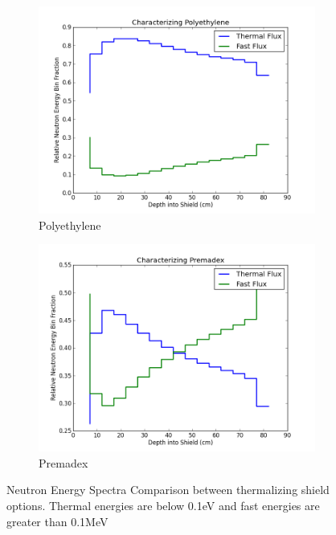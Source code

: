 \documentclass{mc2015}
\begin{document}
\begin{figure}
	\centering
	\begin{subfigure}{0.49\textwidth}
		\includegraphics[width=\textwidth]{Poly_char.png}
		\caption{Polyethylene}
		\label{fig:polychar}
	\end{subfigure}
	\begin{subfigure}{0.49\textwidth}
		\includegraphics[width=\textwidth]{Prem_char.png}
		\caption{Premadex}
		\label{fig:premchar}
	\end{subfigure}
	\caption{Neutron Energy Spectra Comparison between thermalizing shield options. Thermal energies are below 0.1eV and fast energies are greater than 0.1MeV}
	\label{fig:chars}
\end{figure}
\end{document}
